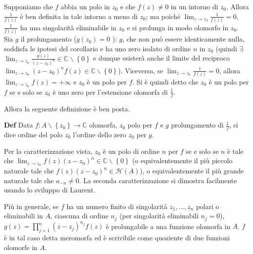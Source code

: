 \documentclass{article}
\begin{document}
Supponiamo che $f$ abbia un polo in $z_{0}$ e che $f\left( z\right) \neq 0$
in un intorno di $z_{0}$. Allora $\frac{1}{f\left( z\right) }$ \`{e} ben
definita in tale intorno a meno di $z_{0}$; ma poich\'{e} $%
\lim_{z\rightarrow z_{0}}\frac{1}{f\left( z\right) }=0$, $\frac{1}{f\left(
z\right) }$ ha una singolarit\`{a} eliminabile in $z_{0}$ e si prolunga in
modo olomorfo in $z_{0}$. Sia $g$ il prolungamento ($g\left( z_{0}\right) =0$%
): $g$, che non pu\`{o} essere identicamente nulla, soddisfa le ipotesi del
corollario e ha uno zero isolato di ordine $n$ in $z_{0}$ (quindi $\exists $ 
$\lim_{z\rightarrow z_{0}}\frac{g\left( z\right) }{\left( z-z_{0}\right) ^{n}%
}\in 
\mathbb{C}
\backslash \left\{ 0\right\} $ e dunque esister\`{a} anche il limite del
reciproco $\lim_{z\rightarrow z_{0}}\left( z-z_{0}\right) ^{n}f\left(
z\right) \in 
\mathbb{C}
\backslash \left\{ 0\right\} $). Viceversa, se $\lim_{z\rightarrow z_{0}}%
\frac{1}{f\left( z\right) }=0$, allora $\lim_{z\rightarrow z_{0}}f\left(
z\right) =+\infty $ e $z_{0}$ \`{e} un polo per $f$. Si \`{e} quindi detto
che $z_{0}$ \`{e} un polo per $f$ se e solo se $z_{0}$ \`{e} uno zero per
l'estensione olomorfa di $\frac{1}{f}$.

Allora la seguente definizione \`{e} ben posta.

\textbf{Def} Data $f:A\backslash \left\{ z_{0}\right\} \rightarrow 
\mathbb{C}
$ olomorfa, $z_{0}$ polo per $f$ e $g$ prolungamento di $\frac{1}{f}$, si
dice ordine del polo $z_{0}$ l'ordine dello zero $z_{0}$ per $g$.

Per la caratterizzazione vista, $z_{0}$ \`{e} un polo di ordine $n$ per $f$
se e solo se $n$ \`{e} tale che $\lim_{z\rightarrow z_{0}}f\left( z\right)
\left( z-z_{0}\right) ^{n}\in 
\mathbb{C}
\backslash \left\{ 0\right\} $ (o equivalentemente il pi\`{u} piccolo
naturale tale che $f\left( z\right) \left( z-z_{0}\right) ^{n}\in \mathcal{H}%
\left( A\right) $), o equivalentemente il pi\`{u} grande naturale tale che $%
a_{-n}\neq 0$. La seconda caratterizzazione si dimostra facilmente usando lo
sviluppo di Laurent.

Pi\`{u} in generale, se $f$ ha un numero finito di singolarit\`{a} $%
z_{1},...,z_{n}$ polari o eliminabili in $A$, ciascuna di ordine $n_{j}$
(per singolarit\`{a} eliminabili $n_{j}=0$), $g\left( z\right)
=\prod_{j=1}^{n}\left( z-z_{j}\right) ^{n_{j}}f\left( z\right) $ \`{e}
prolungabile a una funzione olomorfa in $A$. $f$ \`{e} in tal caso detta
meromorfa ed \`{e} scrivibile come quoziente di due funzioni olomorfe in $A$.
\end{document}
